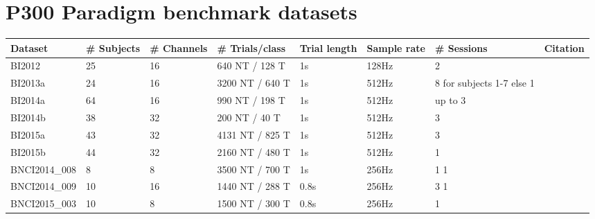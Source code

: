 \documentclass[twocolumn]{article}
\begin{document}
\section{P300 Paradigm benchmark datasets}
\begin{table}[h]
	\begin{tabular}{@{}llllllll@{}}
		\toprule
		Dataset        & \# Subjects                & \# Channels & \# Trials/class  & Trial
		length         & Sample rate                & \# Sessions & Citation                   \\ \midrule
		BI2012         & 25                         & 16          & 640 NT / 128 T   & 1s    &
		128Hz          & 2                          &                                          \\
		BI2013a        & 24                         & 16          & 3200 NT / 640 T  & 1s    &
		512Hz          & 8 for subjects 1-7 else 1  &                                          \\
		BI2014a        & 64                         & 16          & 990 NT / 198 T   & 1s    &
		512Hz          & up to 3                    &                                          \\
		BI2014b        & 38                         & 32          & 200 NT / 40 T    & 1s    &
		512Hz          & 3                          &                                          \\
		BI2015a        & 43                         & 32          & 4131 NT / 825 T  & 1s    &
		512Hz          & 3                          &                                          \\
		BI2015b        & 44                         & 32          & 2160 NT / 480 T  & 1s    &
		512Hz          & 1                          &                                          \\
		BNCI2014\_008  & 8                          & 8           & 3500 NT / 700 T  & 1s    &
		256Hz          & 1                        1                                            \\
		BNCI2014\_009  & 10                         & 16          & 1440 NT / 288 T  & 0.8s  &
		256Hz          & 3                        1                                            \\
		BNCI2015\_003  & 10                         & 8           & 1500 NT / 300 T  & 0.8s  &
		256Hz          & 1                          &                                          \\

\end{tabular}
\end{table}
\end{document}
